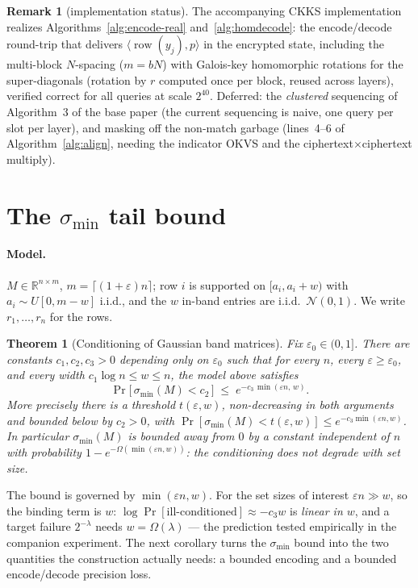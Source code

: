 \documentclass[11pt]{article}
\newcommand{\sigmin}{\sigma_{\min}}
\DeclareMathOperator{\row}{row}
\theoremstyle{plain}
\newtheorem{theorem}{Theorem}
\theoremstyle{definition}
\newtheorem{remark}{Remark}
\begin{document}
\begin{remark}[implementation status]\label{rmk:garbage}
The accompanying CKKS implementation realizes Algorithms~\ref{alg:encode-real}
and~\ref{alg:homdecode}: the encode/decode round-trip that delivers
$\langle\row(y_j),p\rangle$ in the encrypted state, including the multi-block $N$-spacing
($m=bN$) with Galois-key homomorphic rotations for the super-diagonals (rotation by $r$
computed once per block, reused across layers), verified correct for all queries at scale
$2^{40}$. Deferred: the \emph{clustered} sequencing of Algorithm~3 of the base paper (the
current sequencing is naive, one query per slot per layer), and masking off the non-match
garbage (lines~4--6 of Algorithm~\ref{alg:align}, needing the indicator OKVS and the
ciphertext$\times$ciphertext multiply).
\end{remark}

\section{The $\sigmin$ tail bound}\label{sec:sigmin}

\paragraph{Model.} $M\in\mathbb R^{n\times m}$, $m=\lceil(1+\varepsilon)n\rceil$; row $i$ is
supported on $[a_i,a_i+w)$ with $a_i\sim U[0,m-w]$ i.i.d., and the $w$ in-band entries are
i.i.d.\ $\mathcal N(0,1)$. We write $r_1,\dots,r_n$ for the rows.

\begin{theorem}[Conditioning of Gaussian band matrices]\label{thm:sigmin}
Fix $\varepsilon_0\in(0,1]$. There are constants $c_1,c_2,c_3>0$ depending only on
$\varepsilon_0$ such that for every $n$, every $\varepsilon\ge\varepsilon_0$, and every width
$c_1\log n\le w\le n$, the model above satisfies
\[
   \Pr\big[\,\sigmin(M)<c_2\,\big]\;\le\;e^{-c_3\,\min(\varepsilon n,\,w)} .
\]
More precisely there is a threshold $t(\varepsilon,w)$, non-decreasing in both arguments and
bounded below by $c_2>0$, with $\Pr[\sigmin(M)<t(\varepsilon,w)]\le e^{-c_3\min(\varepsilon n,w)}$.
In particular $\sigmin(M)$ is bounded away from $0$ by a constant \emph{independent of $n$}
with probability $1-e^{-\Omega(\min(\varepsilon n,w))}$: the conditioning does not degrade with
set size.
\end{theorem}

The bound is governed by $\min(\varepsilon n, w)$. For the set sizes of interest $\varepsilon
n\gg w$, so the binding term is $w$: $\log\Pr[\text{ill-conditioned}]\approx -c_3 w$ is
\emph{linear in $w$}, and a target failure $2^{-\lambda}$ needs $w=\Omega(\lambda)$ --- the
prediction tested empirically in the companion experiment. The next corollary turns the
$\sigmin$ bound into the two quantities the construction actually needs: a bounded encoding
and a bounded encode/decode precision loss.
\end{document}
